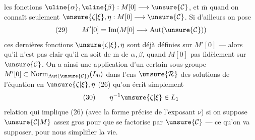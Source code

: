 
les fonctions $\uline{\alpha},\uline{\beta}:M[0]\longrightarrow\unsure{\mathcal{C}}$,
et $\overline{\mathrm m}$ quand on connaît seulement
$\unsure{\zeta|\xi},\eta:M[0]\longrightarrow\unsure{\mathcal{C}}$.
Si d'ailleurs on pose
\[
(29)\qquad
M'[0]=\operatorname{Im}(M[0]\longrightarrow\operatorname{Aut}(\unsure{\mathcal{C}}))
\]
ces dernières fonctions $\unsure{\zeta|\xi},\eta$ sont déjà définies sur $M'[0]$ --- alors qu'il
n'est pas clair qu'il en soit de $\overline{\mathrm m}$ de $\alpha,\beta$, quand
$M[0]$  pas fidèlement sur $\unsure{\mathcal{C}}$.
On a ainsi une application \inserted{$(\unsure{\zeta|\xi},\eta)$} d'un certain sous-groupe
$M'[0]\subset\operatorname{Norm}_{\operatorname{Aut}(\unsure{\mathcal{C}})}(L_0)$
dans l'ens $\unsure{\mathcal{R}}$ des solutions de l'équation en $\unsure{\zeta|\xi},\eta$
(26) qu'on écrit simplement
\[
(30)\qquad \eta^{-1}\unsure{\zeta|\xi}\in L_1
\]
relation qui implique (26) (avec la forme précise de l'exposant $\nu$)
si on suppose  $\unsure{\mathcal{C}|M}$ assez gros pour que
se factorise par $\unsure{\mathcal{C}}$ --- ce qu'on va supposer, pour nous simplifier la vie.

